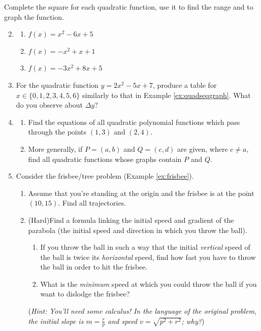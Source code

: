 \begin{exercises}{}{}
\exstart Complete the square for each quadratic function, use it to find the range and to graph the function.
\begin{enumerate}\setcounter{enumi}{1}  
  \item[]\begin{enumerate}
    \item $f(x)=x^2-6x+5$ %
    \item $f(x)=-x^2+x+1$ %
    \item $f(x)=-3x^2+8x+5$ %
  \end{enumerate}
  
  
  \item For the quadratic function $y=2x^2-5x+7$, produce a table for $x\in\{0,1,2,3,4,5,6\}$ similarly to that in Example \ref{ex:quadseqgraph}. What do you observe about $\Delta y$?
  
  
	\item\begin{enumerate}
	  \item Find the equations of all quadratic polynomial functions which pass through the points $(1,3)$ and $(2,4)$.
		\item More generally, if $P=(a,b)$ and $Q=(c,d)$ are given, where $c\neq a$, find all quadratic functions whose graphs contain $P$ and $Q$.
	\end{enumerate}
  
  \item\label{exs:frisbee} Consider the frisbee/tree problem (Example \ref{ex:frisbee}).
  \begin{enumerate}
    \item Assume that you're standing at the origin and the frisbee is at the point $(10,15)$. Find all trajectories.
    \item (Hard)\lstsp Find a formula linking the initial speed and gradient of the parabola (the initial speed and direction in which you throw the ball).
    \begin{enumerate}
			\item If you throw the ball in such a way that the initial \emph{vertical} speed of the ball is twice its \emph{horizontal} speed, find how fast you have to throw the ball in order to hit the frisbee.
      \item What is the \emph{minimum} speed at which you could throw the ball if you want to dislodge the frisbee?
    \end{enumerate}
    (\emph{Hint: You'll need some calculus! In the language of the original problem, the initial slope is $m=\frac rp$ and speed $v=\sqrt{p^2+r^2}$; why?})
	\end{enumerate}


\end{enumerate}
\end{exercises}

